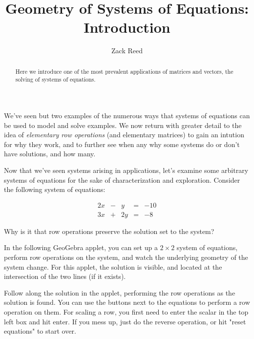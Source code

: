 \documentclass{ximera}
\author{Zack Reed} %
\title{Geometry of Systems of Equations: Introduction}
\begin{document}
\begin{abstract}
Here we introduce one of the most prevalent applications of matrices and vectors, the solving of systems of equations.
\end{abstract}
\maketitle

\begin{exploration}

  We've seen but two examples of the numerous ways that systems of equations can be used to model and solve examples. We now return with greater detail to the idea of \emph{elementary row operations} (and elementary matrices) to gain an intution for why they work, and to further see when any why some systems do or don't have solutions, and how many.

  \begin{example}

    Now that we've seen systems arising in applications, let's examine some arbitrary systems of equations for the sake of characterization and exploration. Consider the following system of equations:
 
    $$\begin{matrix}
      2x& -&y&=&-10\\
      3x & +&2y&= &-8
    \end{matrix}$$

    Why is it that row operations preserve the solution set to the system?

    In the following GeoGebra applet, you can set up a $2\times 2$ system of equations, perform row operations on the system, and watch the underlying geometry of the system change. For this applet, the solution is visible, and located at the intersection of the two lines (if it exists).

    \begin{center}
    \end{center}

    Follow along the solution in the applet, performing the row operations as the solution is found. You can use the buttons next to the equations to perform a row operation on them. For scaling a row, you first need to enter the scalar in the top left box and hit enter. If you mess up, just do the reverse operation, or hit "reset equations" to start over.
    

\end{example}
\end{exploration}
\end{document}
